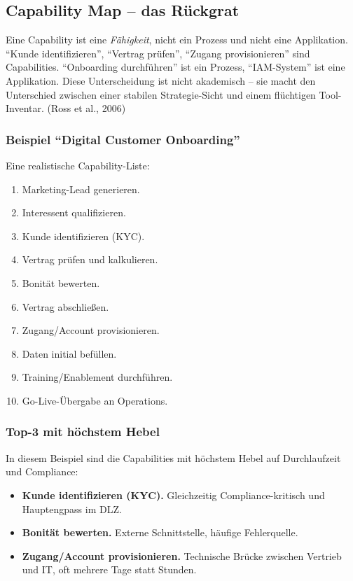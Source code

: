 \documentclass[11pt,a4paper,oneside]{article}
\newcommand{\quelle}[1]{{\footnotesize\color{lpGray}(#1)}}
\begin{document}
\subsection{Capability Map -- das Rückgrat}

Eine Capability ist eine \emph{Fähigkeit}, nicht ein Prozess und nicht eine Applikation. ``Kunde identifizieren'', ``Vertrag prüfen'', ``Zugang provisionieren'' sind Capabilities. ``Onboarding durchführen'' ist ein Prozess, ``IAM-System'' ist eine Applikation. Diese Unterscheidung ist nicht akademisch -- sie macht den Unterschied zwischen einer stabilen Strategie-Sicht und einem flüchtigen Tool-Inventar. \quelle{Ross et al., 2006}

\subsubsection{Beispiel ``Digital Customer Onboarding''}

Eine realistische Capability-Liste:

\begin{enumerate}
  \item Marketing-Lead generieren.
  \item Interessent qualifizieren.
  \item Kunde identifizieren (KYC).
  \item Vertrag prüfen und kalkulieren.
  \item Bonität bewerten.
  \item Vertrag abschließen.
  \item Zugang/Account provisionieren.
  \item Daten initial befüllen.
  \item Training/Enablement durchführen.
  \item Go-Live-Übergabe an Operations.
\end{enumerate}

\subsubsection{Top-3 mit höchstem Hebel}

In diesem Beispiel sind die Capabilities mit höchstem Hebel auf Durchlaufzeit und Compliance:

\begin{itemize}
  \item \textbf{Kunde identifizieren (KYC).} Gleichzeitig Compliance-kritisch und Hauptengpass im DLZ.
  \item \textbf{Bonität bewerten.} Externe Schnittstelle, häufige Fehlerquelle.
  \item \textbf{Zugang/Account provisionieren.} Technische Brücke zwischen Vertrieb und IT, oft mehrere Tage statt Stunden.
\end{itemize}
\end{document}
